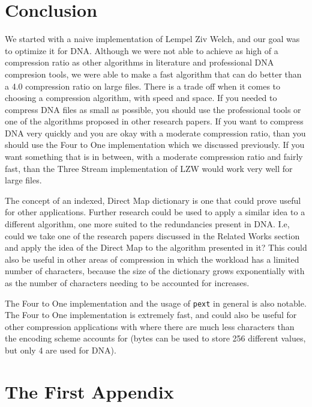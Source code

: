\documentclass[12pt,twoside]{reedthesis}
\begin{document}
\hypertarget{conclusion}{%
\chapter*{Conclusion}\label{conclusion}}

We started with a naive implementation of Lempel Ziv Welch, and our goal was to optimize it for DNA. Although we were not able to achieve as high of a compression ratio as other algorithms in literature and professional DNA compresion tools, we were able to make a fast algorithm that can do better than a 4.0 compression ratio on large files. There is a trade off when it comes to choosing a compression algorithm, with speed and space. If you needed to compress DNA files as small as possible, you should use the professional tools or one of the algorithms proposed in other research papers. If you want to compress DNA very quickly and you are okay with a moderate compression ratio, than you should use the Four to One implementation which we discussed previously. If you want something that is in between, with a moderate compression ratio and fairly fast, than the Three Stream implementation of LZW would work very well for large files.

The concept of an indexed, Direct Map dictionary is one that could prove useful for other applications. Further research could be used to apply a similar idea to a different algorithm, one more suited to the redundancies present in DNA. I.e, could we take one of the research papers discussed in the Related Works section and apply the idea of the Direct Map to the algorithm presented in it? This could also be useful in other areas of compression in which the workload has a limited number of characters, because the size of the dictionary grows exponentially with as the number of characters needing to be accounted for increases.

The Four to One implementation and the usage of \texttt{pext} in general is also notable. The Four to One implementation is extremely fast, and could also be useful for other compression applications with where there are much less characters than the encoding scheme accounts for (bytes can be used to store 256 different values, but only 4 are used for DNA).

\appendix

\hypertarget{the-first-appendix}{%
\chapter{The First Appendix}\label{the-first-appendix}}
\end{document}
